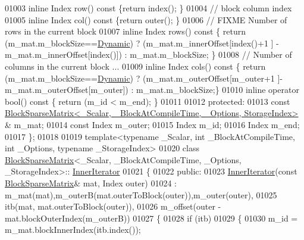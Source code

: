 \begin{DoxyCode}
01003     \textcolor{keyword}{inline} Index row()\textcolor{keyword}{ const  }\{\textcolor{keywordflow}{return} index(); \}
01004     \textcolor{comment}{// block column index}
01005     \textcolor{keyword}{inline} Index col()\textcolor{keyword}{ const }\{\textcolor{keywordflow}{return} outer(); \}
01006     \textcolor{comment}{// FIXME Number of rows in the current block}
01007     \textcolor{keyword}{inline} Index rows()\textcolor{keyword}{ const }\{ \textcolor{keywordflow}{return} (m\_mat.m\_blockSize==\hyperlink{namespace_eigen_ad81fa7195215a0ce30017dfac309f0b2}{Dynamic}) ? (m\_mat.m\_innerOffset[index()+1
      ] - m\_mat.m\_innerOffset[index()]) : m\_mat.m\_blockSize; \}
01008     \textcolor{comment}{// Number of columns in the current block ...}
01009     \textcolor{keyword}{inline} Index cols()\textcolor{keyword}{ const }\{ \textcolor{keywordflow}{return} (m\_mat.m\_blockSize==\hyperlink{namespace_eigen_ad81fa7195215a0ce30017dfac309f0b2}{Dynamic}) ? (m\_mat.m\_outerOffset[m\_outer+1
      ]-m\_mat.m\_outerOffset[m\_outer]) : m\_mat.m\_blockSize;\}
01010     \textcolor{keyword}{inline} \textcolor{keyword}{operator} bool()\textcolor{keyword}{ const }\{ \textcolor{keywordflow}{return} (m\_id < m\_end); \}
01011 
01012   \textcolor{keyword}{protected}:
01013     \textcolor{keyword}{const} 
      \hyperlink{group___sparse_core___module}{BlockSparseMatrix<\_Scalar, \_BlockAtCompileTime, \_Options, StorageIndex>}
      & m\_mat;
01014     \textcolor{keyword}{const} Index m\_outer;
01015     Index m\_id;
01016     Index m\_end;
01017 \};
01018 
01019 \textcolor{keyword}{template}<\textcolor{keyword}{typename} \_Scalar, \textcolor{keywordtype}{int} \_BlockAtCompileTime, \textcolor{keywordtype}{int} \_Options, \textcolor{keyword}{typename} \_StorageIndex>
01020 \textcolor{keyword}{class }\hyperlink{group___sparse_core___module_class_eigen_1_1_block_sparse_matrix}{BlockSparseMatrix}<\_Scalar, \_BlockAtCompileTime, \_Options, \_StorageIndex>::
      \hyperlink{class_eigen_1_1_inner_iterator}{InnerIterator}
01021 \{
01022   \textcolor{keyword}{public}:
01023     \hyperlink{class_eigen_1_1_inner_iterator}{InnerIterator}(\textcolor{keyword}{const} \hyperlink{group___sparse_core___module_class_eigen_1_1_block_sparse_matrix}{BlockSparseMatrix}& mat, Index outer)
01024     : m\_mat(mat),m\_outerB(mat.outerToBlock(outer)),m\_outer(outer),
01025       itb(mat, mat.outerToBlock(outer)),
01026       m\_offset(outer - mat.blockOuterIndex(m\_outerB))
01027      \{
01028         \textcolor{keywordflow}{if} (itb)
01029         \{
01030           m\_id = m\_mat.blockInnerIndex(itb.index());

\end{DoxyCode}
